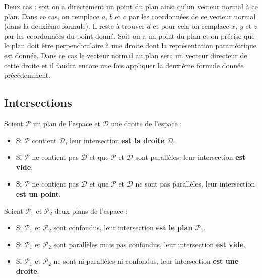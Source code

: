	\begin{tip}
		Deux cas : soit on a directement un point du plan ainsi qu'un vecteur normal à ce plan. Dans ce cas, on remplace $a$, $b$ et $c$ par les coordonnées de ce vecteur normal (dans la deuxième formule). Il reste à trouver $d$ et pour cela on remplace $x$, $y$ et $z$ par les coordonnées du point donné.
		\newpar
		Soit on a un point du plan et on précise que le plan doit être perpendiculaire à une droite dont la représentation paramétrique est donnée. Dans ce cas le vecteur normal au plan sera un vecteur directeur de cette droite et il faudra encore une fois appliquer la deuxième formule donnée précédemment.
	\end{tip}
	
	\subsection{Intersections}
	
	\begin{formula}
		Soient $\mathcal{P}$ un plan de l'espace et $\mathcal{D}$ une droite de l'espace :
		\begin{itemize}
			\item Si $\mathcal{P}$ contient $\mathcal{D}$, leur intersection \textbf{est la droite $\mathcal{D}$}.
			\item Si $\mathcal{P}$ ne contient pas $\mathcal{D}$ et que $\mathcal{P}$ et $\mathcal{D}$ sont parallèles, leur intersection \textbf{est vide}.
			\item Si $\mathcal{P}$ ne contient pas $\mathcal{D}$ et que $\mathcal{P}$ et $\mathcal{D}$ ne sont pas parallèles, leur intersection \textbf{est un point}.
		\end{itemize}
	\end{formula}
	
	\begin{formula}
		Soient $\mathcal{P}_1$ et $\mathcal{P}_2$ deux plans de l'espace :
		\begin{itemize}
			\item Si $\mathcal{P}_1$ et $\mathcal{P}_2$ sont confondus, leur intersection \textbf{est le plan $\mathcal{P}_1$}.
			\item Si $\mathcal{P}_1$ et $\mathcal{P}_2$ sont parallèles mais pas confondus, leur intersection \textbf{est vide}.
			\item Si $\mathcal{P}_1$ et $\mathcal{P}_2$ ne sont ni parallèles ni confondus, leur intersection \textbf{est une droite}.
		\end{itemize}
	\end{formula}
	
